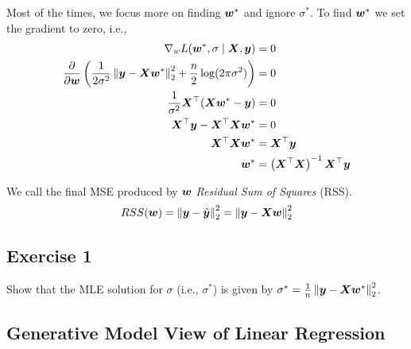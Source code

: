 \documentclass[letterpaper,12pt]{article}
\theoremstyle{plain}
\theoremstyle{definition}
\theoremstyle{remark}
\newcommand{\norm}[1]{\left\lVert#1\right\rVert}
\begin{document}
Most of the times, we focus more on finding ${\bm{w}}^*$ and ignore $\sigma^*$.
%
To find ${\bm{w}}^*$ we set the gradient to zero, i.e.,
\begin{align}
    \nabla_w L(\vw^*, \sigma \mid \mX, \vy)                                                                                         & = 0                                             \\
    \frac{\partial}{\partial \vw} \left( \frac{1}{2 \sigma^2} \norm{\vy - \mX \vw^*}_2^2 + \frac{n}{2} \log (2\pi \sigma^2) \right) & = 0 \label{eq:MLEvw}                            \\
    \frac{1}{\sigma^2} \mX^\top (\mX \vw^* - \vy)                                                                                   & = 0 \label{eq:MLEvw2}                           \\
    \mX^\top \vy - \mX^\top \mX \vw^*                                                                                               & = 0 \label{eq:MLEvw3}                           \\
    \mX^\top \mX \vw^*                                                                                                              & = \mX^\top \vy                                  \\
    \vw^*                                                                                                                           & = \left( \mX^\top \mX \right)^{-1} \mX^\top \vy
\end{align}

We call the final MSE produced by ${\bm{w}}$ \emph{Residual Sum of Squares} (RSS).
\begin{align}
    RSS(\vw) = \norm{\vy - \hat{\vy}}_2^2 = \norm{\vy - \mX \vw}_2^2
\end{align}

\subsection*{Exercise 1}

Show that the MLE solution for $\sigma$ (i.e., $\sigma^*$) is given by $\sigma^* = \frac{1}{n} \norm{\vy - \mX \vw^*}_2^2$.

\subsection{Generative Model View of Linear Regression}
\end{document}
